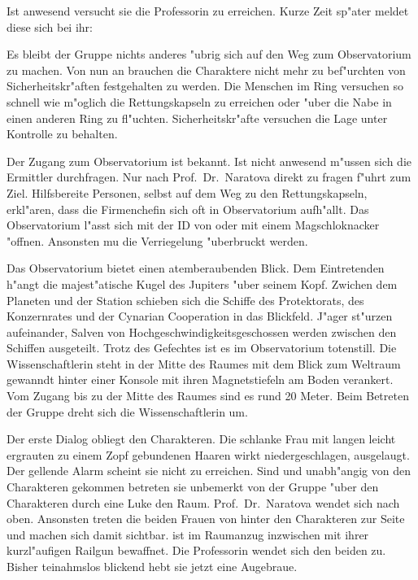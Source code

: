 Ist \ml{} anwesend versucht sie die Professorin zu erreichen. Kurze Zeit sp"ater meldet diese sich bei ihr:


Es bleibt der Gruppe nichts anderes "ubrig sich auf den Weg zum Observatorium zu machen. Von nun an brauchen die Charaktere nicht mehr zu bef"urchten von Sicherheitskr"aften festgehalten zu werden. Die Menschen im Ring versuchen so schnell wie m"oglich die Rettungskapseln zu erreichen oder "uber die Nabe in einen anderen Ring zu fl"uchten. Sicherheitskr"afte versuchen die Lage unter Kontrolle zu behalten.

Der Zugang zum Observatorium ist \ml{} bekannt. Ist \ml{} nicht anwesend m"ussen sich die Ermittler durchfragen. Nur nach Prof.~Dr.~Naratova direkt zu fragen f"uhrt zum Ziel. Hilfsbereite Personen, selbst auf dem Weg zu den Rettungskapseln, erkl"aren, dass die Firmenchefin sich oft in  Observatorium aufh"allt. Das Observatorium l"asst sich mit der ID von \ml{} oder mit einem Magschlo\3knacker "offnen. Ansonsten mu\3 die Verriegelung "uberbruckt werden.

Das Observatorium bietet einen atemberaubenden Blick. Dem Eintretenden h"angt die majest"atische Kugel des Jupiters "uber seinem Kopf. Zwichen dem Planeten und der Station schieben sich die Schiffe des Protektorats, des Konzernrates und der Cynarian Cooperation in das Blickfeld. J"ager st"urzen aufeinander, Salven von Hochgeschwindigkeitsgeschossen werden zwischen den Schiffen ausgeteilt. Trotz des Gefechtes ist es im Observatorium totenstill. Die Wissenschaftlerin steht in der Mitte des Raumes mit dem Blick zum Weltraum gewanndt hinter einer Konsole mit ihren Magnetstiefeln am Boden verankert. Vom Zugang bis zu der Mitte des Raumes sind es rund 20 Meter. Beim Betreten der Gruppe dreht sich die Wissenschaftlerin um.


Der erste Dialog obliegt den Charakteren. Die schlanke Frau mit langen leicht ergrauten zu einem Zopf gebundenen Haaren wirkt niedergeschlagen, ausgelaugt. Der gellende Alarm scheint sie nicht zu erreichen. Sind \xl{} und \ml{} unabh"angig von den Charakteren gekommen betreten sie unbemerkt von der Gruppe "uber den Charakteren durch eine Luke den Raum. Prof.~Dr.~Naratova wendet sich nach oben. Ansonsten treten die beiden Frauen von hinter den Charakteren zur Seite und machen sich damit sichtbar. \xl{} ist im Raumanzug inzwischen mit ihrer kurzl"aufigen Railgun bewaffnet. Die Professorin wendet sich den beiden zu. Bisher teinahmslos blickend hebt sie jetzt eine Augebraue.


